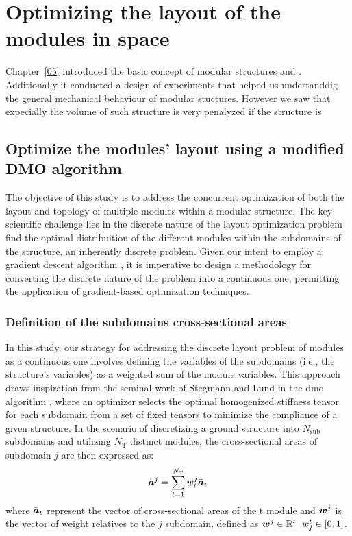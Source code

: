 \setchapterpreamble[u]{\margintoc}
\glsresetall %
\chapter{Optimizing the layout of the modules in space}
Chapter~\ref{05} introduced the basic concept of modular structures and  . Additionally it conducted a design of experiments that helped us undertanddig the general mechanical behaviour of modular stuctures. However we saw that expecially the volume of such structure is very penalyzed if the structure is 


\section{Optimize the modules' layout using a modified DMO algorithm}
The objective of this study is to address the concurrent optimization of both the layout and topology of multiple modules within a modular structure. The key scientific challenge lies in the discrete nature of the layout optimization problem \ie find the optimal distribuition of the different modules within the subdomains of the structure, an inherently discrete problem. Given our intent to employ a gradient descent algorithm , it is imperative to design a methodology for converting the discrete nature of the problem into a continuous one, permitting the application of gradient-based optimization techniques.

\subsection{Definition of the subdomains cross-sectional areas}
In this study, our strategy for addressing the discrete layout problem of modules as a continuous one involves defining the variables of the subdomains (i.e., the structure's variables) as a weighted sum of the module variables. This approach draws inspiration from the seminal work of Stegmann and Lund in the \gls{dmo} algorithm , where an optimizer selects the optimal homogenized stiffness tensor for each subdomain from a set of fixed tensors to minimize the compliance of a given structure. In the scenario of discretizing a ground structure into $N_\text{sub}$ subdomains and utilizing $N_\text{T}$ distinct modules, the cross-sectional areas of subdomain $j$ are then expressed as:  
\begin{equation}
    \bm{a}^j = \sum_{t=1}^{N_\text{T}} w_t^j \bar{\bm{a}}_t 
\end{equation}
where $\bar{\bm{a}}_t $ represent the vector of cross-sectional areas of the t module and $\bm{w}^j$ is the vector of weight relatives to the $j$ subdomain, defined as $ \bm{w}^j \in \mathbb{R}^t\,|\,w_j^t \in [0,1]$.

